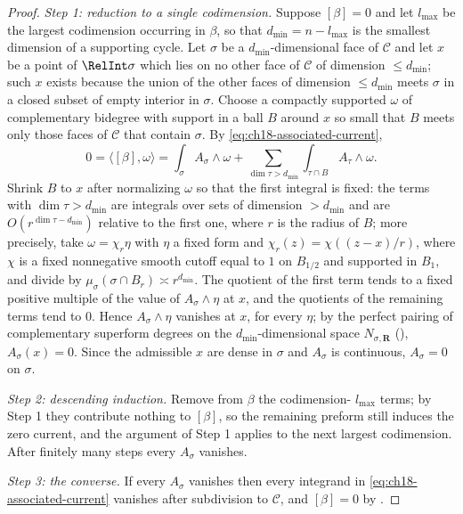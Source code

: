 \begin{proof}
\emph{Step 1: reduction to a single codimension.}  Suppose $[\beta]=0$ and
let $l_{\max}$ be the largest codimension occurring in $\beta$, so that
$d_{\min}=n-l_{\max}$ is the smallest dimension of a supporting cycle.  Let
$\sigma$ be a $d_{\min}$-dimensional face of $\mathscr C$ and let $x$ be a
point of $\RelInt\sigma$ which lies on no other face of $\mathscr C$ of
dimension $\leq d_{\min}$; such $x$ exists because the union of the other
faces of dimension $\leq d_{\min}$ meets $\sigma$ in a closed subset of
empty interior in $\sigma$.  Choose a compactly supported
$\omega$ of complementary bidegree with support in a ball $B$ around $x$ so
small that $B$ meets only those faces of $\mathscr C$ that contain $\sigma$.
By \eqref{eq:ch18-associated-current},
\[
 0=\langle[\beta],\omega\rangle
 =\int_\sigma A_\sigma\wedge\omega
 +\sum_{\dim\tau>d_{\min}}\int_{\tau\cap B}A_\tau\wedge\omega .
\]
Shrink $B$ to $x$ after normalizing $\omega$ so that the first integral is
fixed: the terms with $\dim\tau>d_{\min}$ are integrals over sets of
dimension $>d_{\min}$ and are $O(r^{\dim\tau-d_{\min}})$ relative to the
first one, where $r$ is the radius of $B$; more precisely, take
$\omega=\chi_r\eta$ with $\eta$ a fixed form and
$\chi_r(z)=\chi((z-x)/r)$, where $\chi$ is a fixed nonnegative smooth
cutoff equal to $1$ on $B_{1/2}$ and supported in $B_1$, and divide by
$\mu_\sigma(\sigma\cap B_r)\asymp r^{d_{\min}}$.  The quotient of the first
term tends to a fixed positive multiple of the value of
$A_\sigma\wedge\eta$ at $x$, and the quotients of
the remaining terms tend to $0$.  Hence $A_\sigma\wedge\eta$ vanishes at
$x$, for every $\eta$; by the perfect pairing of complementary superform
degrees on the $d_{\min}$-dimensional space $N_{\sigma,\mathbf R}$
(), $A_\sigma(x)=0$.  Since the admissible
$x$ are dense in $\sigma$ and $A_\sigma$ is continuous, $A_\sigma=0$ on
$\sigma$.

\emph{Step 2: descending induction.}  Remove from $\beta$ the codimension-%
$l_{\max}$ terms; by Step 1 they contribute nothing to $[\beta]$, so the
remaining preform still induces the zero current, and the argument of Step 1
applies to the next largest codimension.  After finitely many steps every
$A_\sigma$ vanishes.

\emph{Step 3: the converse.}  If every $A_\sigma$ vanishes then every
integrand in \eqref{eq:ch18-associated-current} vanishes after subdivision
to $\mathscr C$, and $[\beta]=0$ by
.
\end{proof}

